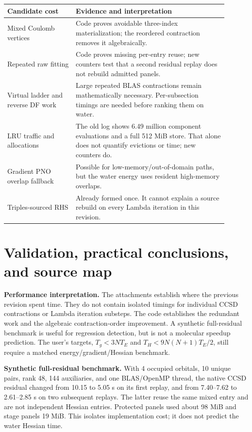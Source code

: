 \documentclass[10pt,letterpaper]{article}
\newcommand{\sectionpage}[1]{\newpage\section{#1}}
\begin{document}
\begin{center}\begin{tabular}{p{0.28\linewidth}p{0.62\linewidth}}\toprule
Candidate cost & Evidence and interpretation\\\midrule
Mixed Coulomb vertices & Code proves avoidable three-index materialization; the reordered contraction removes it algebraically.\\
Repeated raw fitting & Code proves missing per-entry reuse; new counters test that a second residual replay does not rebuild admitted panels.\\
Virtual ladder and reverse DF work & Large repeated BLAS contractions remain mathematically necessary. Per-subsection timings are needed before ranking them on water.\\
LRU traffic and allocations & The old log shows 6.49 million component evaluations and a full 512 MiB store. That alone does not quantify evictions or time; new counters do.\\
Gradient PNO overlap fallback & Possible for low-memory/out-of-domain paths, but the water energy uses resident high-memory overlaps.\\
Triples-sourced RHS & Already formed once. It cannot explain a source rebuild on every Lambda iteration in this revision.\\\bottomrule
\end{tabular}\end{center}

\sectionpage{Validation, practical conclusions, and source map}
\textbf{Performance interpretation.} The attachments establish where the previous revision spent time. They do not contain isolated timings for individual CCSD contractions or Lambda iteration substeps. The code establishes the redundant work and the algebraic contraction-order improvement. A synthetic full-residual benchmark is useful for regression detection, but is not a molecular speedup prediction. The user's targets, $T_g<3N T_E$ and $T_H<9N(N+1)T_E/2$, still require a matched energy/gradient/Hessian benchmark.

\textbf{Synthetic full-residual benchmark.} With 4 occupied orbitals, 10 unique pairs, rank 48, 144 auxiliaries, and one BLAS/OpenMP thread, the native CCSD residual changed from 10.15 to 5.05 s on its first replay, and from 7.40--7.62 to 2.61--2.85 s on two subsequent replays. The latter reuse the same mixed entry and are not independent Hessian entries. Protected panels used about 98 MiB and stage panels 19 MiB. This isolates implementation cost; it does not predict the water Hessian time.
\end{document}
